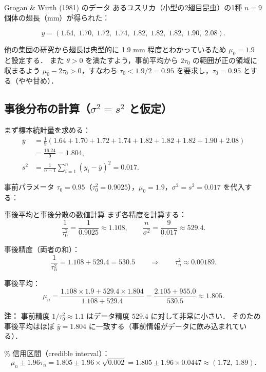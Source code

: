\documentclass[lualatex,ja=standard,a4paper,12pt]{bxjsarticle}
\begin{document}
\begin{exbox}{Grogan \& Wirth (1981) のデータ}
あるユスリカ（小型の2翅目昆虫）の1種 $n=9$ 個体の翅長（mm）が得られた：

\[
  y = (1.64,\; 1.70,\; 1.72,\; 1.74,\; 1.82,\; 1.82,\; 1.82,\; 1.90,\; 2.08).
\]

他の集団の研究から翅長は典型的に 1.9 mm 程度とわかっているため $\mu_0 = 1.9$ と設定する．
また $\theta > 0$ を満たすよう，事前平均から $2\tau_0$ の範囲が正の領域に収まるよう
$\mu_0 - 2\tau_0 > 0$，すなわち $\tau_0 < 1.9/2 = 0.95$ を要求し，$\tau_0 = 0.95$ とする（やや甘め）．
\end{exbox}

\subsection{事後分布の計算（$\sigma^2 = s^2$ と仮定）}

まず標本統計量を求める：
\begin{align*}
  \bar{y} &= \frac{1}{9}(1.64 + 1.70 + 1.72 + 1.74 + 1.82 + 1.82 + 1.82 + 1.90 + 2.08) \\
          &= \frac{16.24}{9} = 1.804, \\[6pt]
  s^2 &= \frac{1}{n-1}\sum_{i=1}^n (y_i - \bar{y})^2 = 0.017.
\end{align*}

事前パラメータ $\tau_0 = 0.95$（$\tau_0^2 = 0.9025$），$\mu_0 = 1.9$，$\sigma^2 = s^2 = 0.017$ を代入する：

\begin{derivbox}{事後平均と事後分散の数値計算}
まず各精度を計算する：
\[
  \frac{1}{\tau_0^2} = \frac{1}{0.9025} \approx 1.108, \qquad
  \frac{n}{\sigma^2} = \frac{9}{0.017} \approx 529.4.
\]

事後精度（両者の和）：
\[
  \frac{1}{\tau_n^2} = 1.108 + 529.4 = 530.5 \qquad \Rightarrow \qquad \tau_n^2 \approx 0.00189.
\]

事後平均：
\[
  \mu_n
  = \frac{1.108 \times 1.9 + 529.4 \times 1.804}{1.108 + 529.4}
  = \frac{2.105 + 955.0}{530.5}
  \approx 1.805.
\]

\noindent\textbf{注：} 事前精度 $1/\tau_0^2 \approx 1.1$ はデータ精度 $529.4$ に対して非常に小さい．
そのため事後平均はほぼ $\bar{y} = 1.804$ に一致する（事前情報がデータに飲み込まれている）．

\% 信用区間（credible interval）：
\[
  \mu_n \pm 1.96\tau_n
  = 1.805 \pm 1.96 \times \sqrt{0.002}
  = 1.805 \pm 1.96 \times 0.0447
  \approx (1.72,\; 1.89).
\]
\end{derivbox}
\end{document}
